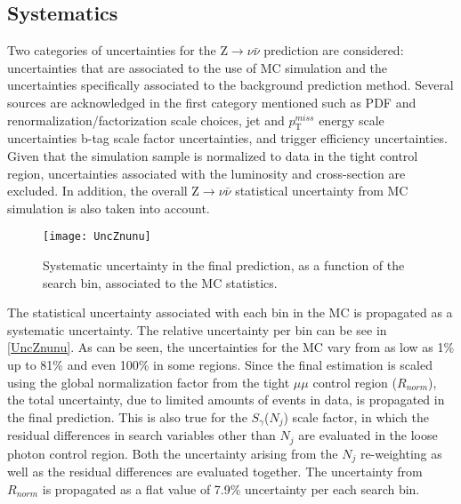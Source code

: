 \subsection{Systematics}\label{systematics}

Two categories of uncertainties for the Z$\rightarrow\nu\bar{\nu}$ prediction are considered: uncertainties that are associated to the use of MC simulation and the uncertainties specifically associated to the background prediction method. Several sources are acknowledged in the first category mentioned such as PDF and renormalization/factorization scale choices, jet and $p_\text{T}^{miss}$ energy scale uncertainties b-tag scale factor uncertainties, and trigger efficiency uncertainties. Given that the simulation sample is normalized to data in the tight control region, uncertainties associated with the luminosity and cross-section are excluded. In addition, the overall Z$\rightarrow\nu\bar{\nu}$ statistical uncertainty from MC simulation is also taken into account.\\

\begin{figure}[H]
\begin{center}
\texttt{[image: UncZnunu]}
\end{center}
\vspace{-1em}
\caption{Systematic uncertainty in the final prediction, as a function of the search bin, associated to the MC statistics.}
\label{UncZnunu}
\end{figure}

The statistical uncertainty associated with each bin in the MC is propagated as a systematic uncertainty. The relative uncertainty per bin can be see in \autoref{UncZnunu}. As can be seen, the uncertainties for the MC vary from as low as 1\% up to 81\% and even 100\% in some regions. Since the final estimation is scaled using the global normalization factor from the tight $\mu\mu$ control region ($R_{norm}$), the total uncertainty, due to limited amounts of events in data, is propagated in the final prediction. This is also true for the $S_\gamma$($N_j$) scale factor, in which the residual differences in search variables other than $N_j$ are evaluated in the loose photon control region. Both the uncertainty arising from the $N_j$ re-weighting as well as the residual differences are evaluated together. The uncertainty from $R_{norm}$ is propagated as a flat value of 7.9\% uncertainty per each search bin.\\

